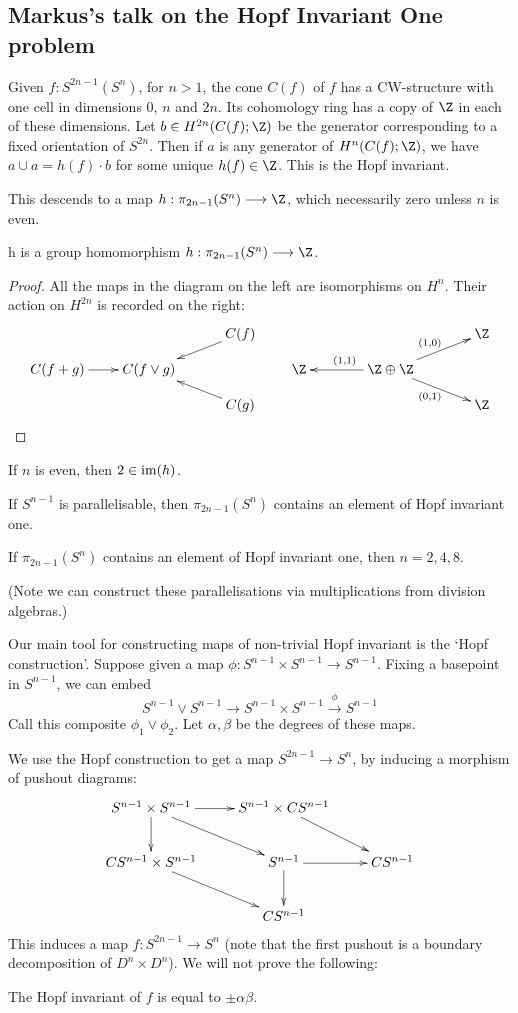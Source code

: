 \documentclass[11pt]{article}
\newcommand{\KanSemResponse}[1]
{
\thispagestyle{fancy}
\section{#1}
}
\begin{document}
\begin{MarkusHopfInvOne}
\KanSemResponse
{Markus's talk on the Hopf Invariant One problem}
Given $f:S^{2n-1}(S^n)$, for $n>1$, the cone $C(f)$ of $f$ has a CW-structure with one cell in dimensions 0, $n$ and $2n$. Its cohomology ring has a copy of $\Z$ in each of these dimensions. Let $b\in H^{2n}(C(f);\Z)$ be the generator corresponding to a fixed orientation of $S^{2n}$. Then if $a$ is any generator of $H^{n}(C(f);\Z)$, we have $a\cup a=h(f)\cdot b$ for some unique $h(f)\in\Z$. This is the Hopf invariant.

This descends to a map $h:\pi_{2n-1}(S^n)\to\Z$, which necessarily zero unless $n$ is even.
\begin{lem*}
h is a group homomorphism $h:\pi_{2n-1}(S^n)\to\Z$.
\end{lem*}
\begin{proof} All the maps in the diagram on the left are isomorphisms on $H^n$. Their action on $H^{2n}$ is recorded on the right:
\[\xymatrix@!0@R=.9cm@C=2.3cm{
&&C(f)\ar[ld]\\
C(f+g)\ar[r]&C(f\vee g)\\
&&C(g)\ar[lu]
}\qquad\xymatrix@!0@R=.9cm@C=2.3cm{
&&\Z\ar[ld];[]^{(1,0)}\\
\Z\ar[r];[]_{(1,1)}&\Z\oplus\Z\\
&&\Z\ar[lu];[]_{(0,1)}
}\]
\end{proof}
\begin{prop*}
If $n$ is even, then $2\in\operatorname{im}(h)$.
\end{prop*}
\begin{prop*}
If $S^{n-1}$ is parallelisable, then $\pi_{2n-1}(S^n)$ contains an element of Hopf invariant one.
\end{prop*}
\begin{thm*}
If $\pi_{2n-1}(S^n)$ contains an element of Hopf invariant one, then $n=2,4,8$.
\end{thm*}
\noindent (Note we can construct these parallelisations via multiplications from division algebras.)

Our main tool for constructing maps of non-trivial Hopf invariant is the `Hopf construction'. Suppose given a map $\phi:S^{n-1}\times S^{n-1}\to S^{n-1}$. Fixing a basepoint in $S^{n-1}$, we can embed
\[S^{n-1}\vee S^{n-1}\to S^{n-1}\times S^{n-1}\overset{\phi}{\to} S^{n-1}\]
Call this composite $\phi_1\vee\phi_2$. Let $\alpha,\beta$ be the degrees of these maps.

We use the Hopf construction to get a map $S^{2n-1}\to S^n$, by inducing a morphism of pushout diagrams:
\[\xymatrix{%
S^{n-1}\times S^{n-1}\ar[r]\ar[d]\ar[rd]&S^{n-1}\times CS^{n-1}\ar[rd]\\
CS^{n-1}\times S^{n-1}\ar[rd]&S^{n-1} \ar[r]\ar[d]&CS^{n-1}\\
&CS^{n-1}
}\]
This induces a map $f:S^{2n-1}\to S^n$ (note that the first pushout is a boundary decomposition of $D^n\times D^n$). We will not prove the following:
\begin{prop*}
The Hopf invariant of $f$ is equal to $\pm\alpha\beta$.
\end{prop*}


\end{MarkusHopfInvOne}
\end{document}
